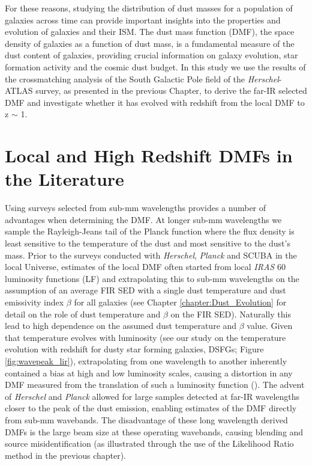 For these reasons, studying the distribution of dust masses for a population of galaxies across time can provide important insights into the properties and evolution of galaxies and their ISM. The dust mass function (DMF), the space density of galaxies as a function of dust mass, is a fundamental measure of the dust content of galaxies, providing crucial information on galaxy evolution, star formation activity and the cosmic dust budget. In this study we use the results of the crossmatching analysis of the South Galactic Pole field of the \textit{Herschel}-ATLAS survey, as presented in the previous Chapter, to derive the far-IR selected DMF and investigate whether it has evolved with redshift from the local DMF to z $\sim$ 1.

\section{Local and High Redshift DMFs in the Literature}

Using surveys selected from sub-mm wavelengths provides a number of advantages when determining the DMF. At longer sub-mm wavelengths we sample the Rayleigh-Jeans tail of the Planck function where the flux density is least sensitive to the temperature of the dust and most sensitive to the dust's mass. Prior to the surveys conducted with \textit{Herschel}, \textit{Planck} and SCUBA in the local Universe, estimates of the local DMF often started from local \textit{IRAS} 60\,\micron luminosity functions (LF) and extrapolating this to sub-mm wavelengths on the assumption of an average FIR SED with a single dust temperature and dust emissivity index $\beta$ for all galaxies (see Chapter \ref{chapter:Dust_Evolution} for detail on the role of dust temperature and $\beta$ on the FIR SED). Naturally this lead to high dependence on the assumed dust temperature and $\beta$ value. Given that temperature evolves with luminosity (see our study on the temperature evolution with redshift for dusty star forming galaxies, DSFGs; Figure \ref{fig:wavepeak_lir}), extrapolating from one wavelength to another inherently contained a bias at high and low luminosity scales, causing a distortion in any DMF measured from the translation of such a luminosity function (\citealt{Dunne_2000}). The advent of \textit{Herschel} and \textit{Planck} allowed for large samples detected at far-IR wavelengths closer to the peak of the dust emission, enabling estimates of the DMF directly from sub-mm wavebands. The disadvantage of these long wavelength derived DMFs is the large beam size at these operating wavebands, causing blending and source misidentification (as illustrated through the use of the Likelihood Ratio method in the previous chapter).

